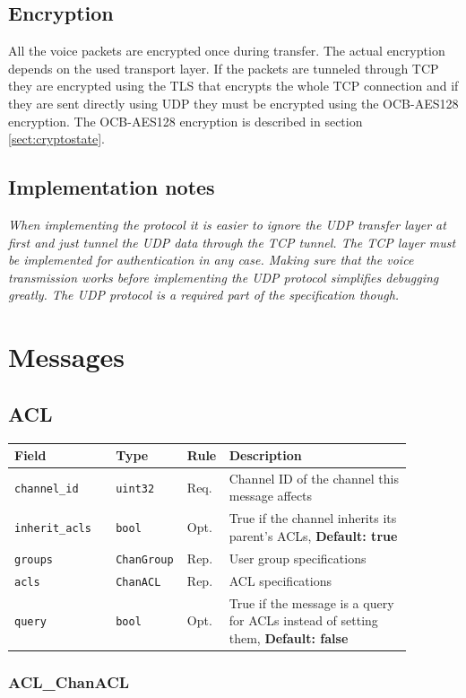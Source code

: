 \documentclass[11pt]{article} %
\newenvironment{mumbleMessageEx}
{%
	\small
	\renewcommand\arraystretch{1.5}
	\begin{tabular}{p{0.25\linewidth}p{0.13\linewidth}p{0.05\linewidth}p{0.45\linewidth}}
	Field & Type & Rule & Description \\
	\hline
}
{%
	\end{tabular}
	\renewcommand\arraystretch{1.0}
}
\newcommand{\mumbleMessageExItem}[4]{ \texttt{#1} & \texttt{#2} & #3 & #4 \\ }
\begin{document}
\subsection{Encryption}

All the voice packets are encrypted once during transfer. The actual encryption depends on the used transport layer. If the packets are tunneled through TCP they are encrypted using the TLS that encrypts the whole TCP connection and if they are sent directly using UDP they must be encrypted using the OCB-AES128 encryption. The OCB-AES128 encryption is described in section \ref{sect:cryptostate}.

\subsection{Implementation notes}

\emph{\small{When implementing the protocol it is easier to ignore the UDP transfer layer at first and just tunnel the UDP data through the TCP tunnel. The TCP layer must be implemented for authentication in any case. Making sure that the voice transmission works before implementing the UDP protocol simplifies debugging greatly. The UDP protocol is a required part of the specification though.}}

\section{Messages}

\subsection{ACL}
\label{msg:acl}

\begin{mumbleMessageEx}
\mumbleMessageExItem{channel\_id}{uint32}{Req.}{Channel ID of the channel this message affects}
\mumbleMessageExItem{inherit\_acls}{bool}{Opt.}{True if the channel inherits its parent's ACLs, \textbf{Default: true}}
\mumbleMessageExItem{groups}{ChanGroup}{Rep.}{User group specifications}
\mumbleMessageExItem{acls}{ChanACL}{Rep.}{ACL specifications}
\mumbleMessageExItem{query}{bool}{Opt.}{True if the message is a query for ACLs instead of setting them, \textbf{Default: false}}
\end{mumbleMessageEx}

\subsubsection{ACL\_ChanACL}
\label{msg:chanACL}
\end{document}
